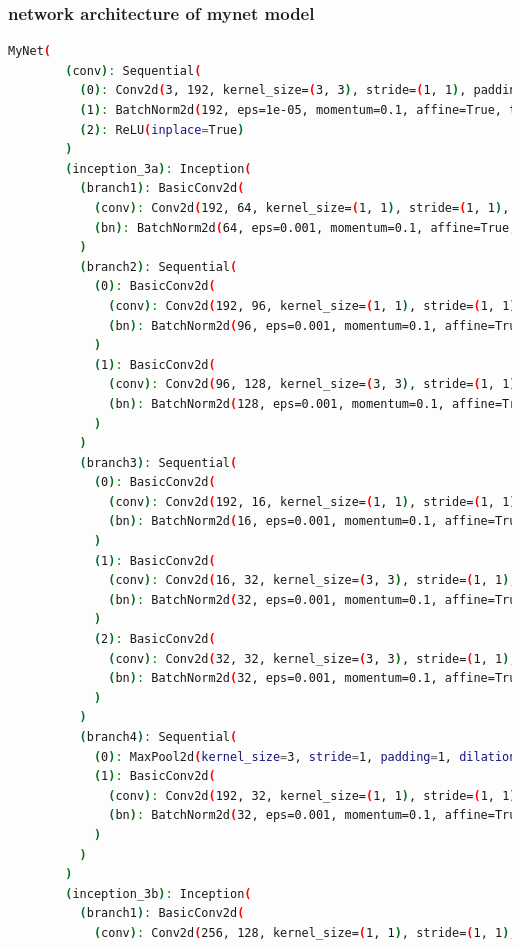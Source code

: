\documentclass[a4paper, 12pt]{article}
\begin{document}
\subsubsection{network architecture of mynet model}
\begin{lstlisting}[language=sh]
    MyNet(
        (conv): Sequential(
          (0): Conv2d(3, 192, kernel_size=(3, 3), stride=(1, 1), padding=(1, 1))
          (1): BatchNorm2d(192, eps=1e-05, momentum=0.1, affine=True, track_running_stats=True)
          (2): ReLU(inplace=True)
        )
        (inception_3a): Inception(
          (branch1): BasicConv2d(
            (conv): Conv2d(192, 64, kernel_size=(1, 1), stride=(1, 1), bias=False)
            (bn): BatchNorm2d(64, eps=0.001, momentum=0.1, affine=True, track_running_stats=True)
          )
          (branch2): Sequential(
            (0): BasicConv2d(
              (conv): Conv2d(192, 96, kernel_size=(1, 1), stride=(1, 1), bias=False)
              (bn): BatchNorm2d(96, eps=0.001, momentum=0.1, affine=True, track_running_stats=True)
            )
            (1): BasicConv2d(
              (conv): Conv2d(96, 128, kernel_size=(3, 3), stride=(1, 1), padding=(1, 1), bias=False)
              (bn): BatchNorm2d(128, eps=0.001, momentum=0.1, affine=True, track_running_stats=True)
            )
          )
          (branch3): Sequential(
            (0): BasicConv2d(
              (conv): Conv2d(192, 16, kernel_size=(1, 1), stride=(1, 1), bias=False)
              (bn): BatchNorm2d(16, eps=0.001, momentum=0.1, affine=True, track_running_stats=True)
            )
            (1): BasicConv2d(
              (conv): Conv2d(16, 32, kernel_size=(3, 3), stride=(1, 1), padding=(1, 1), bias=False)
              (bn): BatchNorm2d(32, eps=0.001, momentum=0.1, affine=True, track_running_stats=True)
            )
            (2): BasicConv2d(
              (conv): Conv2d(32, 32, kernel_size=(3, 3), stride=(1, 1), padding=(1, 1), bias=False)
              (bn): BatchNorm2d(32, eps=0.001, momentum=0.1, affine=True, track_running_stats=True)
            )
          )
          (branch4): Sequential(
            (0): MaxPool2d(kernel_size=3, stride=1, padding=1, dilation=1, ceil_mode=False)
            (1): BasicConv2d(
              (conv): Conv2d(192, 32, kernel_size=(1, 1), stride=(1, 1), bias=False)
              (bn): BatchNorm2d(32, eps=0.001, momentum=0.1, affine=True, track_running_stats=True)
            )
          )
        )
        (inception_3b): Inception(
          (branch1): BasicConv2d(
            (conv): Conv2d(256, 128, kernel_size=(1, 1), stride=(1, 1), bias=False)

\end{lstlisting}
\end{document}
